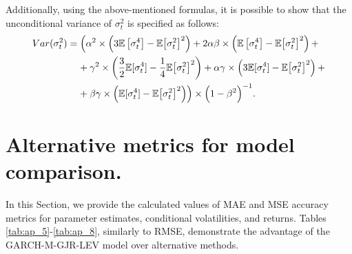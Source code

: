 \documentclass[authoryear, 1p]{elsarticle}
\numberwithin{equation}{section}
\begin{document}
Additionally, using the above-mentioned formulas, it is possible to show that the unconditional variance of $\sigma^2_{t}$ is specified as follows:
\begin{align}
\begin{split}
Var(\sigma^2_{t}) & = \Bigl(\alpha^2 \times \left(3\mathbb{E}\left[\sigma^4_{t}\right] - \mathbb{E}{\left[\sigma^2_{t}\right]}^2 \right) + 2 \alpha \beta \times \left(\mathbb{E}\left[\sigma^4_{t}\right] - \mathbb{E}{\left[\sigma^2_{t}\right]}^2 \right) + \\ 
& \;\;\;\; + \gamma^2 \times \left(\frac{3}{2} \mathbb{E}[\sigma^4_{t}] - 
\frac{1}{4} \mathbb{E}{\left[\sigma^2_{t}\right]}^2 \right) +  \alpha \gamma \times \left(3\mathbb{E}[\sigma^4_{t}] - \mathbb{E}{\left[\sigma^2_{t}\right]}^2 \right) + \\
& \;\;\;\; + \beta \gamma \times \left(\mathbb{E}[\sigma^4_{t}] - \mathbb{E}{\left[\sigma^2_{t}\right]}^2 \right)\Bigr) \times \Bigl(1 - \beta^2 \Bigr) ^ {-1}.
 \end{split}
\end{align}

 \newpage
 
\section{Alternative metrics for model comparison.}

In this Section, we provide the calculated values of MAE and MSE accuracy metrics for parameter estimates, conditional volatilities, and returns. Tables \ref{tab:ap_5}-\ref{tab:ap_8}, similarly to RMSE, demonstrate the advantage of the GARCH-M-GJR-LEV model over alternative methods.
\end{document}
